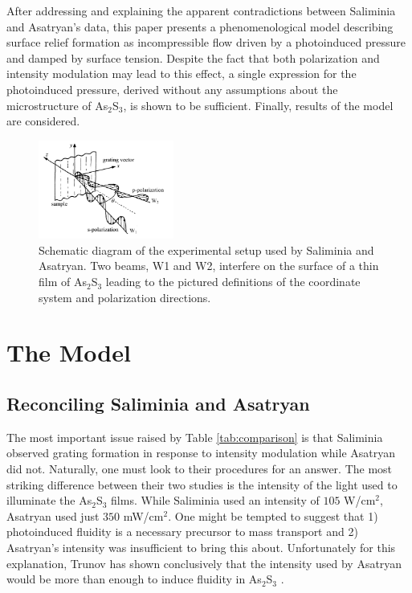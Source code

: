 \documentclass[twocolumn,showpacs,preprintnumbers,amsmath,amssymb]{revtex4}
\begin{document}
After addressing and explaining the apparent contradictions between Saliminia and
Asatryan's data, this paper presents a phenomenological model describing surface relief
formation as incompressible flow driven by a photoinduced pressure and damped by surface
tension. Despite the fact that both polarization and intensity modulation may lead to
this effect, a single expression for the photoinduced pressure, derived without any
assumptions about the microstructure of As$_2$S$_3$, is shown to be sufficient. Finally,
results of the model are considered.

\begin{figure}
 \includegraphics[width=1.75in]{figure/sppic.png}
 \caption{Schematic diagram of the experimental setup used by Saliminia and Asatryan.
   Two beams, W1 and W2, interfere on the surface of a thin film of As$_{2}$S$_{3}$ leading
   to the pictured definitions of the coordinate system and polarization directions.}
 \label{fig:setup}
\end{figure}

\section{The Model}

\subsection{Reconciling Saliminia and Asatryan}
The most important issue raised by Table \ref{tab:comparison} is that Saliminia observed
grating formation in response to intensity modulation while Asatryan did not. Naturally,
one must look to their procedures for an answer. The most striking difference between
their two studies is the intensity of the light used to illuminate the As$_{2}$S$_{3}$
films. While Saliminia used an intensity of $105$ W/cm$^{2}$, Asatryan used just $350$
mW/cm$^{2}$. One might be tempted to suggest that 1) photoinduced fluidity is a necessary
precursor to mass transport and 2) Asatryan's intensity was insufficient to bring this
about. Unfortunately for this explanation, Trunov has shown conclusively that the
intensity used by Asatryan would be more than enough to induce fluidity in
As$_{2}$S$_{3}$ \cite{trunov03}.
\end{document}
